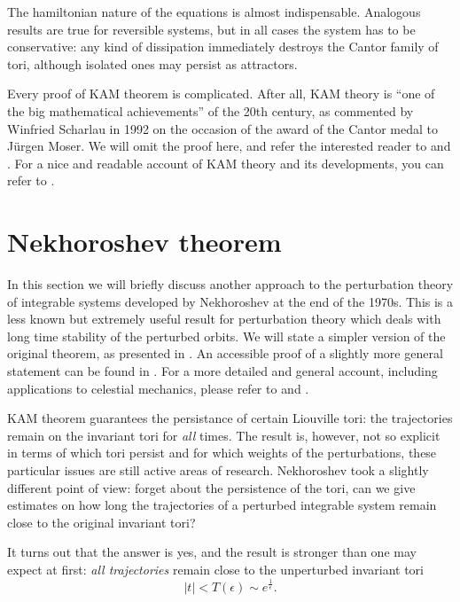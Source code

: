 \documentclass[english,fontsize=11pt,paper=a5,oneside]{scrbook}
\theoremstyle{definition}
\newenvironment{remark}
  {\pushQED{\qed}\renewcommand{\qedsymbol}{$\lozenge$}\remarkx}
  {\popQED\endremarkx}
\begin{document}
\begin{remark}
    The hamiltonian nature of the equations is almost indispensable. Analogous results are true for reversible systems, but in all cases the system has to be conservative:    
    any kind of dissipation immediately destroys the Cantor family of tori, although isolated ones may persist as attractors.
\end{remark}

Every proof of KAM theorem is complicated.
After all, KAM theory is ``one of the big mathematical achievements'' of the 20th century, as commented by Winfried Scharlau in 1992 on the occasion of the award of the Cantor medal to J\"urgen Moser.
We will omit the proof here, and refer the interested reader to \cite[Chapter 15]{book:knauf} and \cite{poschel2001}.
For a nice and readable account of KAM theory and its developments, you can refer to \cite{Broer2004}.

\section{Nekhoroshev theorem}

In this section we will briefly discuss another approach to the perturbation theory of integrable systems developed by Nekhoroshev at the end of the 1970s.
This is a less known but extremely useful result for perturbation theory which deals with long time stability of the perturbed orbits.
We will state a simpler version of the original theorem, as presented in \cite{Benettin1985}.
An accessible proof of a slightly more general statement can be found in \cite{Poschel1993}.
For a more detailed and general account, including applications to celestial mechanics, please refer to \cite[Chapter 8]{book:celletti} and \cite[Chapter 6]{book:arnoldcelestial}.

KAM theorem guarantees the persistance of certain Liouville tori: the trajectories remain on the invariant tori for \emph{all} times. The result is, however, not so explicit in terms of which tori persist and for which weights of the perturbations, these particular issues are still active areas of research.
Nekhoroshev took a slightly different point of view: forget about the persistence of the tori, can we give estimates on how long the trajectories of a perturbed integrable system remain close to the original invariant tori?

It turns out that the answer is yes, and the result is stronger than one may expect at first: \emph{all trajectories} remain close to the unperturbed invariant tori 
\begin{equation}
    |t| < T(\epsilon) \sim e^{\frac1\epsilon}.
\end{equation}
\end{document}
